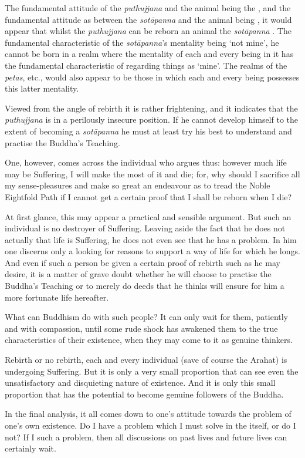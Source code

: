The fundamental attitude of the \emph{puthujjana} and the animal being the , and the fundamental attitude as between the \emph{sotāpanna} and the animal being , it would appear that whilst the \emph{puthujjana} can be reborn an animal the \emph{sotāpanna} . The fundamental characteristic of the \emph{sotāpanna}'s mentality being `not mine', he cannot be born in a realm where the mentality of each and every being in it has the fundamental characteristic of regarding things as `mine'. The realms of the \emph{petas}, etc., would also appear to be those in which each and every being possesses this latter mentality.

Viewed from the angle of rebirth it is rather frightening, and it indicates that the \emph{puthujjana} is in a perilously insecure position. If he cannot develop himself to the extent of becoming a \emph{sotāpanna} he must at least try his best to understand and practise the Buddha's Teaching.

One, however, comes across the individual who argues thus: however much life may be Suffering, I will make the most of it and die; for, why should I sacrifice all my sense-pleasures and make so great an endeavour as to tread the Noble Eightfold Path if I cannot get a certain proof that I shall be reborn when I die?

At first glance, this may appear a practical and sensible argument. But such an individual is no destroyer of Suffering. Leaving aside the fact that he does not actually  that life is Suffering, he does not even see that he has a problem. In him one discerns only a looking for reasons to support a way of life for which he longs. And even if such a person be given a certain proof of rebirth such as he may desire, it is a matter of grave doubt whether he will choose to practise the Buddha's Teaching or to merely do deeds that he thinks will ensure for him a more fortunate life hereafter.

What can Buddhism do with such people? It can only wait for them, patiently and with compassion, until some rude shock has awakened them to the true characteristics of their existence, when they may come to it as genuine thinkers.

Rebirth or no rebirth, each and every individual (save of course the Arahat) is undergoing Suffering. But it is only a very small proportion that can see even the unsatisfactory and disquieting nature of existence. And it is only this small proportion that has the potential to become genuine followers of the Buddha.

In the final analysis, it all comes down to one's attitude towards the problem of one's own existence. Do I have a  problem which I must solve in the  itself, or do I not? If I  such a problem, then all discussions on past lives and future lives can certainly wait.
